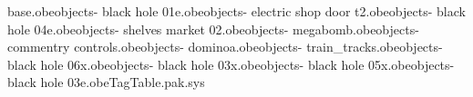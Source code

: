 base.obe objects\bank - black hole 01e.obe objects\bank - electric shop door t2.obe objects\bank - black hole 04e.obe objects\bank - shelves market 02.obe objects\bank - megabomb.obe objects\bank - commentry controls.obe objects\bank - dominoa.obe objects\newbank - train_tracks.obe objects\bank - black hole 06x.obe objects\bank - black hole 03x.obe objects\bank - black hole 05x.obe objects\bank - black hole 03e.obe TagTable.pak.sys 